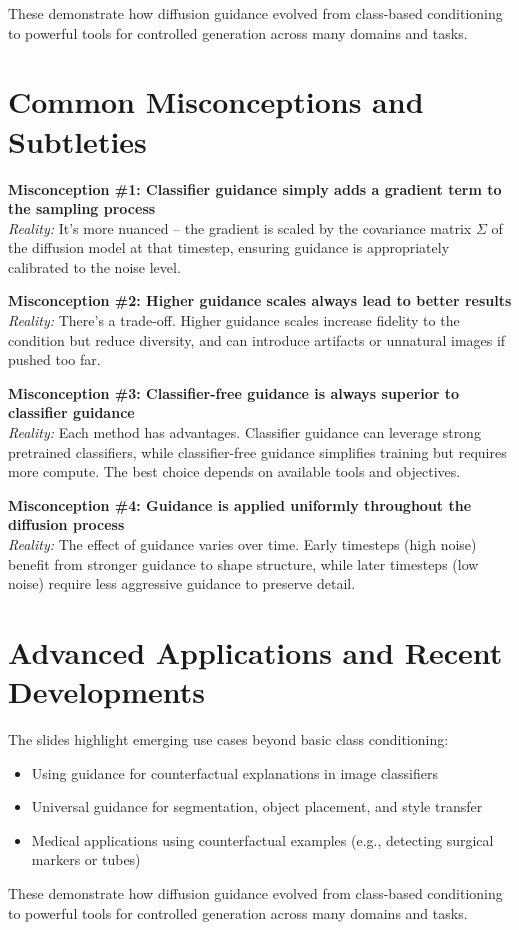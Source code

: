 These demonstrate how diffusion guidance evolved from class-based conditioning to powerful tools for controlled generation across many domains and tasks.

\section{Common Misconceptions and Subtleties}

\textbf{Misconception \#1: Classifier guidance simply adds a gradient term to the sampling process}\\
\textit{Reality:} It's more nuanced – the gradient is scaled by the covariance matrix $\Sigma$ of the diffusion model at that timestep, ensuring guidance is appropriately calibrated to the noise level.

\vspace{0.5em}
\textbf{Misconception \#2: Higher guidance scales always lead to better results}\\
\textit{Reality:} There’s a trade-off. Higher guidance scales increase fidelity to the condition but reduce diversity, and can introduce artifacts or unnatural images if pushed too far.

\vspace{0.5em}
\textbf{Misconception \#3: Classifier-free guidance is always superior to classifier guidance}\\
\textit{Reality:} Each method has advantages. Classifier guidance can leverage strong pretrained classifiers, while classifier-free guidance simplifies training but requires more compute. The best choice depends on available tools and objectives.

\vspace{0.5em}
\textbf{Misconception \#4: Guidance is applied uniformly throughout the diffusion process}\\
\textit{Reality:} The effect of guidance varies over time. Early timesteps (high noise) benefit from stronger guidance to shape structure, while later timesteps (low noise) require less aggressive guidance to preserve detail.

\section{Advanced Applications and Recent Developments}

The slides highlight emerging use cases beyond basic class conditioning:

\begin{itemize}
    \item Using guidance for counterfactual explanations in image classifiers
    \item Universal guidance for segmentation, object placement, and style transfer
    \item Medical applications using counterfactual examples (e.g., detecting surgical markers or tubes)
\end{itemize}

These demonstrate how diffusion guidance evolved from class-based conditioning to powerful tools for controlled generation across many domains and tasks.

